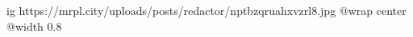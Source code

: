  
 
 
 
 

\ifcmt
  ig https://mrpl.city/uploads/posts/redactor/nptbzqruahxvzrl8.jpg
  @wrap center
  @width 0.8
\fi
